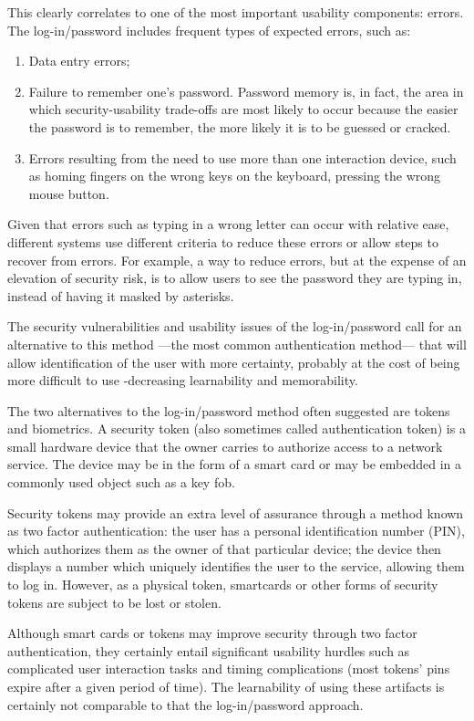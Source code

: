 \documentclass{article}
\begin{document}
This clearly correlates to one of the most important usability components: errors.  The log-in/password includes frequent types of expected errors, such as:
\begin{enumerate}
\item Data entry errors;
\item Failure to remember one’s password. Password memory is, in fact, the area in which security-usability trade-offs are most likely to occur because the easier the password is to remember, the more likely it is to be guessed or cracked. 
\item Errors resulting from the need to use more than one interaction device, such as homing fingers on the wrong keys on the keyboard, pressing the wrong mouse button. 
\end{enumerate}

Given that errors such as typing in a wrong letter can occur with relative ease, different systems use different criteria to reduce these errors or allow steps to recover from errors. For example, a way to reduce errors, but at the expense of an elevation of security risk, is to allow users to see the password they are typing in, instead of having it masked by asterisks.

The security vulnerabilities and usability issues of the log-in/password call for an alternative to this method ---the most common authentication method--- that will allow identification of the user with more certainty, probably at the cost of being more difficult to use -decreasing learnability and memorability.

The two alternatives to the log-in/password method often suggested are tokens and biometrics. A security token (also sometimes called authentication token) is a small hardware device that the owner carries to authorize access to a network service. The device may be in the form of a smart card or may be embedded in a commonly used object such as a key fob. 

Security tokens may provide an extra level of assurance through a method known as two factor authentication: the user has a personal identification number (PIN), which authorizes them as the owner of that particular device; the device then displays a number which uniquely identifies the user to the service, allowing them to log in. However, as a physical token, smartcards or other forms of security tokens are subject to be lost or stolen. 

Although smart cards or tokens may improve security through two factor authentication, they certainly entail significant usability hurdles such as complicated user interaction tasks and timing complications (most tokens’ pins expire after a given period of time). The learnability of using these artifacts is certainly not comparable to that the log-in/password approach.  
\end{document}
